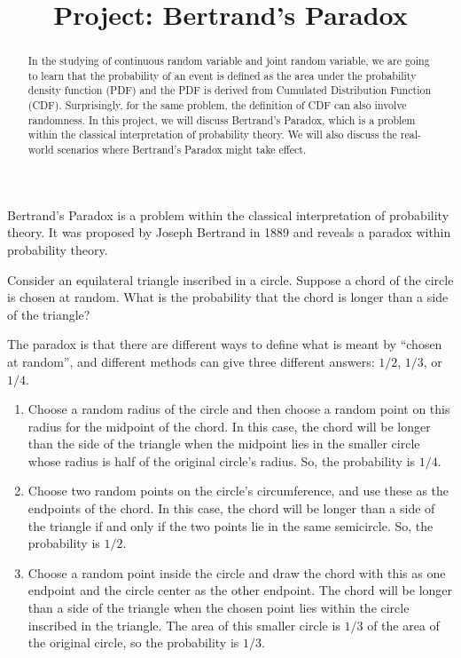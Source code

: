 \documentclass{article}
\title{Project: Bertrand's Paradox}
\author{}
\date{}
\theoremstyle{definition}
\theoremstyle{remark}
\begin{document}
\maketitle

\begin{abstract}
    In the studying of continuous random variable and joint random variable, we are going to learn that the probability of an event is defined as the area under the probability density function (PDF) and the PDF is derived from Cumulated Distribution Function (CDF). Surprisingly, for the same problem, the definition of CDF can also involve randomness. In this project, we will discuss Bertrand's Paradox, which is a problem within the classical interpretation of probability theory. We will also discuss the real-world scenarios where Bertrand's Paradox might take effect.
\end{abstract}

Bertrand's Paradox is a problem within the classical interpretation of probability theory. It was proposed by Joseph Bertrand in 1889 and reveals a paradox within probability theory.

Consider an equilateral triangle inscribed in a circle. Suppose a chord of the circle is chosen at random. What is the probability that the chord is longer than a side of the triangle?

The paradox is that there are different ways to define what is meant by ``chosen at random'', and different methods can give three different answers: $1/2$, $1/3$, or $1/4$.

\begin{enumerate}
    \item Choose a random radius of the circle and then choose a random point on this radius for the midpoint of the chord. In this case, the chord will be longer than the side of the triangle when the midpoint lies in the smaller circle whose radius is half of the original circle's radius. So, the probability is $1/4$.
    \item Choose two random points on the circle's circumference, and use these as the endpoints of the chord. In this case, the chord will be longer than a side of the triangle if and only if the two points lie in the same semicircle. So, the probability is $1/2$.
    \item Choose a random point inside the circle and draw the chord with this as one endpoint and the circle center as the other endpoint. The chord will be longer than a side of the triangle when the chosen point lies within the circle inscribed in the triangle. The area of this smaller circle is $1/3$ of the area of the original circle, so the probability is $1/3$.
\end{enumerate}
\end{document}
